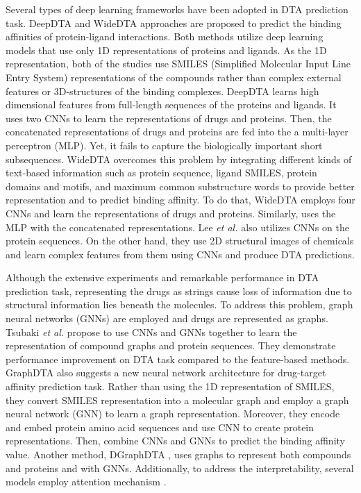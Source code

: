 Several types of deep learning frameworks have been adopted in DTA prediction task. DeepDTA \cite{ozturk2018deepdta} and WideDTA \cite{ozturk2019widedta} approaches are proposed to predict the binding affinities of protein-ligand interactions. Both methods utilize deep learning models that use only 1D representations of proteins and ligands. As the 1D representation, both of the studies use SMILES (Simplified Molecular Input Line Entry System) representations of the compounds rather than complex external features or 3D-structures of the binding complexes. DeepDTA learns high dimensional features from full-length sequences of the proteins and ligands. It uses two CNNs to learn the representations of drugs and proteins. Then, the concatenated representations of drugs and proteins are fed into the a multi-layer perceptron (MLP). Yet, it fails to capture the biologically important short subsequences. WideDTA overcomes this problem by integrating different kinds of text-based information such as protein sequence, ligand SMILES, protein domains and motifs, and maximum common substructure words to provide better representation and to predict binding affinity. To do that, WideDTA employs four CNNs and learn the representations of drugs and proteins. Similarly, uses the MLP with the concatenated representations. Lee \textit{et al.} \cite{lee2019deepconv} also utilizes CNNs on the protein sequences. On the other hand, they use 2D structural images of chemicals and learn complex features from them using CNNs and produce DTA predictions.

Although the extensive experiments and remarkable performance in DTA prediction task, representing the drugs as strings cause loss of information due to structural information lies beneath the molecules. To address this problem, graph neural networks (GNNs) are employed and drugs are represented as graphs. Tsubaki \textit{et al.} \cite{tsubaki2019compound} propose to use CNNs and GNNs together to learn the representation of compound graphs and protein sequences. They demonstrate performance improvement on DTA task compared to the feature-based methods. GraphDTA \cite{nguyen2019graphdta} also suggests a new neural network architecture for drug-target affinity prediction task. Rather than using the 1D representation of SMILES, they convert SMILES representation into a molecular graph and employ a graph neural network (GNN) to learn a graph representation. Moreover, they encode and embed protein amino acid sequences and use CNN to create protein representations. Then, combine CNNs and GNNs to predict the binding affinity value. Another method, DGraphDTA \cite{jiang2020drug}, uses graphs to represent both compounds and proteins and with GNNs. Additionally, to address the interpretability, several models employ attention mechanism \cite{karimi2020explainable, chen2020transformercpi, agyemang2020multi, yang2021ml}. 


